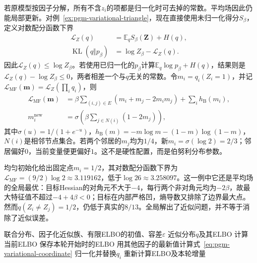 若原模型按因子分解，所有不含$z_i$的项都是归一化时可去掉的常数。平均场因此仍能局部更新。对例~\ref{ex:pgm-variational-triangle}，现在直接使用未归一化得分$S_\beta$，定义对数配分函数下界
\begin{equation}
  \begin{aligned}
    \mathcal L_Z(q)&=\mathbb E_qS_\beta(\bm Z)+H(q),\\
    \operatorname{KL}(q\Vert p_\beta)
      &=\log Z_\beta-\mathcal L_Z(q).
  \end{aligned}
  \label{eq:pgm-variational-partition-lower-bound}
\end{equation}
因此$\mathcal L_Z(q)\leq\log Z_\beta$。若使用已归一化的$p_\beta$计算$\mathbb E_q\log p_\beta+H(q)$，结果则是$\mathcal L_Z(q)-\log Z_\beta\leq0$，两者相差一个与$q$无关的常数。令$m_i=q_i(Z_i=1)$，并记$\mathcal L_{\mathrm{MF}}(\bm m)=\mathcal L_Z(\prod_iq_i)$，则
\begin{equation}
  \begin{aligned}
    \mathcal L_{\mathrm{MF}}(\bm m)
      &=\beta\sum_{(i,j)\in E}
           (m_i+m_j-2m_im_j)+\sum_i h_{\mathrm B}(m_i),\\
    m_i^{\mathrm{new}}
      &=\sigma\left(\beta\sum_{j\in N(i)}(1-2m_j)\right),
  \end{aligned}
  \label{eq:pgm-variational-triangle-mf}
\end{equation}
其中$\sigma(u)=1/(1+e^{-u})$，$h_{\mathrm B}(m)=-m\log m-(1-m)\log(1-m)$，$N(i)$是相邻节点集合。若两个邻居的$m_j$均为$1/4$，新$m_i=\sigma(\log2)=2/3$；邻居偏好$0$，当前变量便更偏好$1$。这不是硬性配置，而是伯努利分布参数。

均匀初始化给出固定点$m_i=1/2$，其对数配分函数下界为$\mathcal L_{\mathrm{MF}}=(9/2)\log2\approx3.119162$，低于$\log26\approx3.258097$。这一例中它还是平均场的全局最优：目标Hessian的对角元不大于$-4$，每行两个非对角元均为$-2\beta$，故最大特征值不超过$-4+4\beta<0$；目标在内部严格凹，熵导数又排除了边界最大点。然而$q(Z_i\ne Z_j)=1/2$，仍低于真实的$8/13$。全局解出了近似问题，并不等于消除了近似误差。

\begin{algorithm}[循环坐标平均场]
  \label{alg:pgm-variational-cavi}
  \begin{algorithmic}[1]
    \Require 联合分布、因子化近似族、有限ELBO的初值、容差$\varepsilon$
    \Ensure 近似分布$q$及其ELBO
    \State 计算当前ELBO
    \Repeat
      \State 保存本轮开始时的ELBO
        \State 用其他因子的最新值计算式~\eqref{eq:pgm-variational-coordinate}
        \State 归一化并替换$q_i$
      \EndFor
      \State 重新计算ELBO及本轮增量
  \end{algorithmic}
\end{algorithm}

